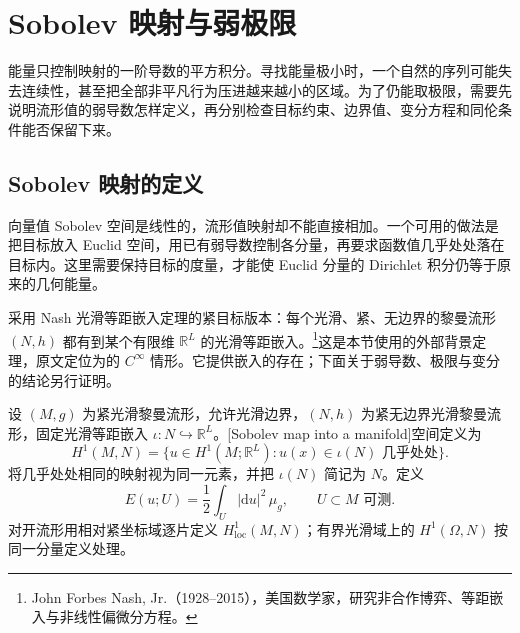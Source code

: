 
% 
% 

\section{Sobolev 映射与弱极限}
\label{g3:sec:1802}

能量只控制映射的一阶导数的平方积分。寻找能量极小时，一个自然的序列可能失去连续性，甚至把全部非平凡行为压进越来越小的区域。为了仍能取极限，需要先说明流形值的弱导数怎样定义，再分别检查目标约束、边界值、变分方程和同伦条件能否保留下来。

\subsection{Sobolev 映射的定义}
\label{g3:subsec:1802:01}

向量值 Sobolev 空间是线性的，流形值映射却不能直接相加。一个可用的做法是把目标放入 Euclid 空间，用已有弱导数控制各分量，再要求函数值几乎处处落在目标内。这里需要保持目标的度量，才能使 Euclid 分量的 Dirichlet 积分仍等于原来的几何能量。

\ProseParagraphBreak

采用 Nash 光滑等距嵌入定理的紧目标版本：每个光滑、紧、无边界的黎曼流形 \((N,h)\) 都有到某个有限维 \(\mathbb R^L\) 的光滑等距嵌入。\footnote{John Forbes Nash, Jr.（1928--2015），美国数学家，研究非合作博弈、等距嵌入与非线性偏微分方程。}这是本节使用的外部背景定理，原文定位为\cite[第59页，定理2]{Nash1956IsometricEmbedding}的 \(C^\infty\) 情形。它提供嵌入的存在；下面关于弱导数、极限与变分的结论另行证明。

\begin{definition}\label{g3:def:sobolev-manifold-map}
	设 \((M,g)\) 为紧光滑黎曼流形，允许光滑边界，\((N,h)\) 为紧无边界光滑黎曼流形，固定光滑等距嵌入 \(\iota:N\hookrightarrow\mathbb R^L\)。[Sobolev map into a manifold]空间定义为
	\[
		H^1(M,N)=\{u\in H^1(M;\mathbb R^L):u(x)\in\iota(N)\text{ 几乎处处}\}.
	\]
	将几乎处处相同的映射视为同一元素，并把 \(\iota(N)\) 简记为 \(N\)。定义
	\begin{equation}\label{g3:eq:weak-map-energy}
		E(u;U)=\frac12\int_U|\mathrm du|^2\,\mu_g,
		\qquad U\subset M\text{ 可测}.
	\end{equation}
	对开流形用相对紧坐标域逐片定义 \(H^1_{\mathrm{loc}}(M,N)\)；有界光滑域上的 \(H^1(\Omega,N)\) 按同一分量定义处理。
\end{definition}


